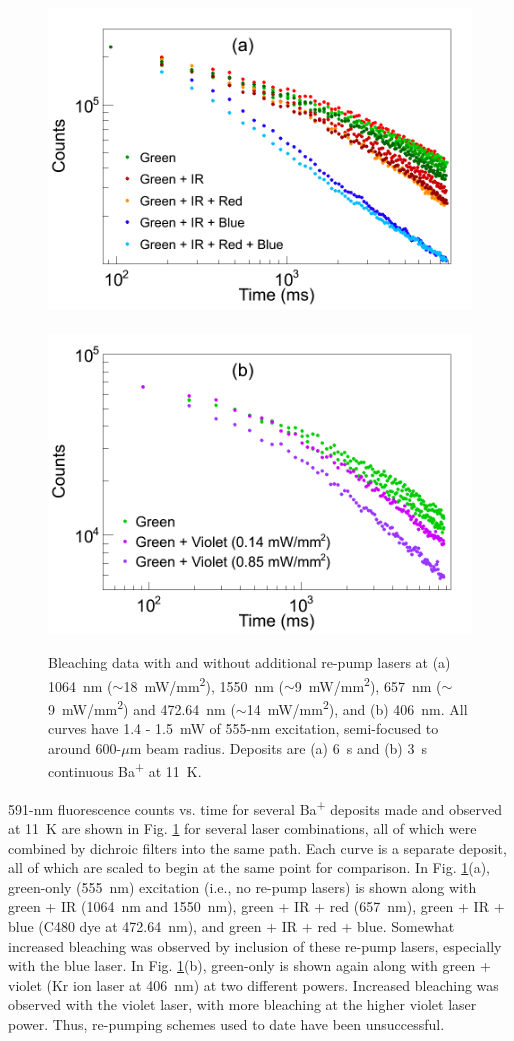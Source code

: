 \begin{figure} %
        \centering
                \includegraphics[width=.5\textwidth]{figures/bleach_re-pump_a.png}
                ~
                \includegraphics[width=.5\textwidth]{figures/bleach_re-pump_b.png}
                \caption{Bleaching data with and without additional re-pump lasers at (a) 1064~nm ($\sim$18~mW/mm\textsuperscript{2}), 1550~nm ($\sim$9~mW/mm\textsuperscript{2}), 657~nm ($\sim$9~mW/mm\textsuperscript{2}) and 472.64~nm ($\sim$14~mW/mm\textsuperscript{2}), and (b) 406~nm.  All curves have 1.4 - 1.5~mW of 555-nm excitation, semi-focused to around 600-$\mu$m beam radius.  Deposits are (a) 6~s and (b) 3~s continuous Ba\textsuperscript{+} at 11~K.}
\label{fig:bleach_repump}
\end{figure}

591-nm fluorescence counts vs. time for several Ba\textsuperscript{+} deposits made and observed at 11~K are shown in Fig. \ref{fig:bleach_repump} for several laser combinations, all of which were combined by dichroic filters into the same path.  Each curve is a separate deposit, all of which are scaled to begin at the same point for comparison.  In Fig. \ref{fig:bleach_repump}(a), green-only (555~nm) excitation (i.e., no re-pump lasers) is shown along with green + IR (1064~nm and 1550~nm), green + IR + red (657~nm), green + IR + blue (C480 dye at 472.64~nm), and green + IR + red + blue.  Somewhat increased bleaching was observed by inclusion of these re-pump lasers, especially with the blue laser.  In Fig. \ref{fig:bleach_repump}(b), green-only is shown again along with green + violet (Kr ion laser at 406~nm) at two different powers.  Increased bleaching was observed with the violet laser, with more bleaching at the higher violet laser power.  Thus, re-pumping schemes used to date have been unsuccessful.

